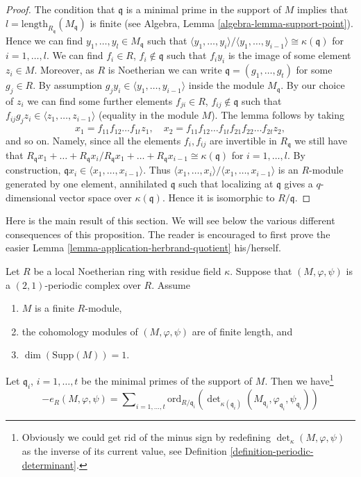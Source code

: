 \begin{proof}
The condition that $\mathfrak q$ is a minimal prime in the support
of $M$ implies that $l = \text{length}_{R_\mathfrak q}(M_\mathfrak q)$
is finite (see Algebra, Lemma \ref{algebra-lemma-support-point}).
Hence we can find $y_1, \ldots, y_l \in M_{\mathfrak q}$
such that
$\langle y_1, \ldots, y_i\rangle / \langle y_1, \ldots, y_{i - 1}\rangle
\cong \kappa(\mathfrak q)$ for $i = 1, \ldots, l$.
We can find $f_i \in R$, $f_i \not \in \mathfrak q$ such that
$f_i y_i$ is the image of some element $z_i \in M$.
Moreover, as $R$ is Noetherian we can write
$\mathfrak q = (g_1, \ldots, g_t)$ for some $g_j \in R$.
By assumption $g_j y_i \in \langle y_1, \ldots, y_{i - 1} \rangle$
inside the module $M_{\mathfrak q}$.
By our choice of $z_i$ we can find some further elements
$f_{ji} \in R$, $f_{ij} \not \in \mathfrak q$ such that
$f_{ij} g_j z_i \in \langle z_1, \ldots, z_{i - 1} \rangle$
(equality in the module $M$).
The lemma follows by taking
$$
x_1 = f_{11}f_{12}\ldots f_{1t}z_1,
\quad
x_2 = f_{11}f_{12}\ldots f_{1t}f_{21}f_{22}\ldots f_{2t}z_2,
$$
and so on. Namely, since all the elements $f_i, f_{ij}$ are invertible
in $R_{\mathfrak q}$ we still have that
$R_{\mathfrak q}x_1 + \ldots + R_{\mathfrak q}x_i /
R_{\mathfrak q}x_1 + \ldots + R_{\mathfrak q}x_{i - 1}
\cong \kappa(\mathfrak q)$ for $i = 1, \ldots, l$.
By construction, $\mathfrak q x_i \in \langle x_1, \ldots, x_{i - 1}\rangle$.
Thus $\langle x_1, \ldots, x_i\rangle / \langle x_1, \ldots, x_{i - 1}\rangle$
is an $R$-module generated by one element, annihilated $\mathfrak q$
such that localizing at $\mathfrak q$ gives a $q$-dimensional
vector space over $\kappa(\mathfrak q)$.
Hence it is isomorphic to $R/\mathfrak q$.
\end{proof}

\noindent
Here is the main result of this section.
We will see below the various different
consequences of this proposition.
The reader is encouraged to first prove the easier
Lemma \ref{lemma-application-herbrand-quotient} his/herself.

\begin{proposition}
\label{proposition-length-determinant-periodic-complex}
Let $R$ be a local Noetherian ring with residue field $\kappa$.
Suppose that $(M, \varphi, \psi)$ is a $(2, 1)$-periodic
complex over $R$. Assume
\begin{enumerate}
\item $M$ is a finite $R$-module,
\item the cohomology modules of $(M, \varphi, \psi)$ are of finite length, and
\item $\dim(\text{Supp}(M)) = 1$.
\end{enumerate}
Let $\mathfrak q_i$, $i = 1, \ldots, t$ be the minimal
primes of the support of $M$. Then we have\footnote{
Obviously we could get rid of the minus sign by redefining
$\det_\kappa(M, \varphi, \psi)$ as the inverse of its
current value, see Definition \ref{definition-periodic-determinant}.}
$$
- e_R(M, \varphi, \psi) =
\sum\nolimits_{i = 1, \ldots, t}
\text{ord}_{R/\mathfrak q_i}\left(
\det\nolimits_{\kappa(\mathfrak q_i)}
(M_{\mathfrak q_i}, \varphi_{\mathfrak q_i}, \psi_{\mathfrak q_i})
\right)
$$
\end{proposition}

